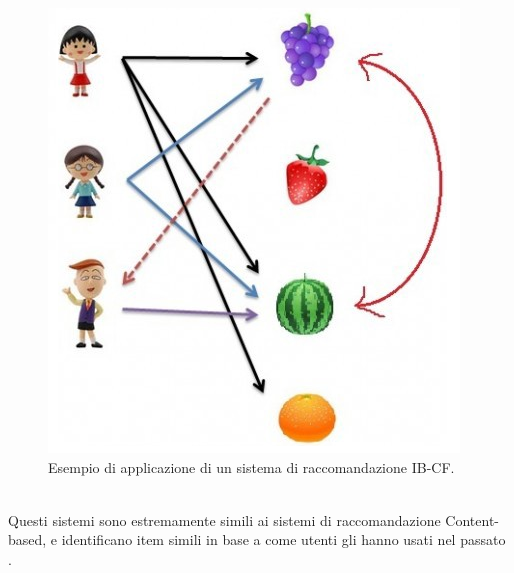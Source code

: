 \begin{figure}[ht!]
	\centering
	\includegraphics[scale=0.5]{images/IB_CF_ex.png}
	\caption{Esempio di applicazione di un sistema di raccomandazione IB-CF.}
	\label{fig:IB_CF}
\end{figure}
\ \\
Questi sistemi sono estremamente simili ai sistemi di raccomandazione Content-based, e identificano item simili in base a come utenti gli
hanno usati nel passato \cite{item-based-collaborative-filtering}.


